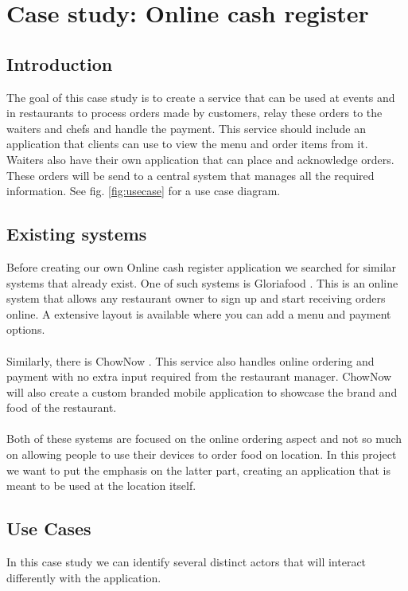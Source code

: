 \documentclass[12pt]{article}
\begin{document}
\section{Case study: Online cash register}\label{sec:casestudy}
\begin{multicols}{2}
\subsection{Introduction}
The goal of this case study is to create a service that can be used at events and in restaurants to process orders made by customers, relay these orders to the waiters and chefs and handle the payment. This service should include an application that clients can use to view the menu and order items from it. Waiters also have their own application that can place and acknowledge orders. These orders will be send to a central system that manages all the required information. See fig. \ref{fig:usecase} for a use case diagram.
\subsection{Existing systems}
Before creating our own Online cash register application we searched for similar systems that already exist. One of such systems is Gloriafood \cite{Gloriafood:online}. This is an online system that allows any restaurant owner to sign up and start receiving orders online. A extensive layout is available where you can add a menu and payment options.
\\\\
Similarly, there is ChowNow \cite{Chownow:online}. This service also handles online ordering and payment with no extra input required from the restaurant manager. ChowNow will also create a custom branded mobile application to showcase the brand and food of the restaurant.
\\\\
Both of these systems are focused on the online ordering aspect and not so much on allowing people to use their devices to order food on location. In this project we want to put the emphasis on the latter part, creating an application that is meant to be used at the location itself.
\subsection{Use Cases}
In this case study we can identify several distinct actors that will interact differently with the application.

\end{multicols}
\end{document}
